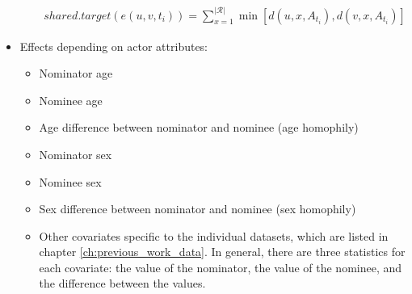 \begin{itemize}
\begin{itemize}
		\begin{align*}
			shared.target(e(u,v,t_i)) = \sum_{x=1}^{\lvert \mathcal{R} \rvert} \min [d(u,x,A_{t_i}), d(v,x,A_{t_i})]
		\end{align*}
	\end{itemize}
	\item Effects depending on actor attributes:
	\begin{itemize}
		\item Nominator age
		\item Nominee age
		\item Age difference between nominator and nominee (age homophily)
		\item Nominator sex
		\item Nominee sex
		\item Sex difference between nominator and nominee (sex homophily)
		\item Other covariates specific to the individual datasets, which are listed in chapter \ref{ch:previous_work_data}. In general, there are three statistics for each covariate: the value of the nominator, the value of the nominee, and the difference between the values.
	\end{itemize}
\end{itemize}

